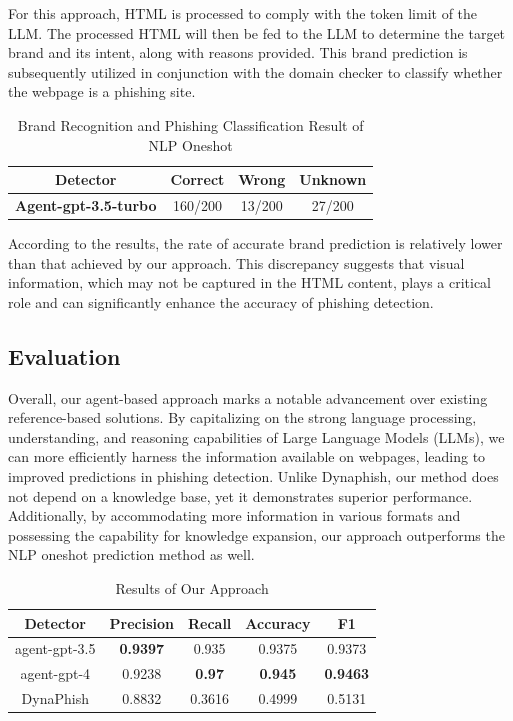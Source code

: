 For this approach, HTML is processed to comply with the token limit of the LLM. The processed HTML will then be fed to the LLM to determine the target brand and its intent, along with reasons provided. This brand prediction is subsequently utilized in conjunction with the domain checker to classify whether the webpage is a phishing site.

\begin{table}[h!]
    \centering
    \begin{tabular}{cccc}
     \textbf{Detector} & \textbf{Correct} & \textbf{Wrong} & \textbf{Unknown} \\
     \midrule
      \textbf{Agent-gpt-3.5-turbo}   & 160/200 & 13/200 & 27/200 \\
    \end{tabular}
    \caption{Brand Recognition and Phishing Classification Result of NLP Oneshot}
    \label{tab:my_label}
\end{table}

According to the results, the rate of accurate brand prediction is relatively lower than that achieved by our approach. This discrepancy suggests that visual information, which may not be captured in the HTML content, plays a critical role and can significantly enhance the accuracy of phishing detection.

\subsection{Evaluation}

Overall, our agent-based approach marks a notable advancement over existing reference-based solutions. By capitalizing on the strong language processing, understanding, and reasoning capabilities of Large Language Models (LLMs), we can more efficiently harness the information available on webpages, leading to improved predictions in phishing detection. Unlike Dynaphish, our method does not depend on a knowledge base, yet it demonstrates superior performance. Additionally, by accommodating more information in various formats and possessing the capability for knowledge expansion, our approach outperforms the NLP oneshot prediction method as well.

\begin{table}[h!]
  \centering
    \caption{Results of Our Approach}
  \begin{tabular}{ccccc}
    \textbf{Detector} & \textbf{Precision} & \textbf{Recall} & \textbf{Accuracy} & \textbf{F1} \\ %
    \midrule %
    agent-gpt-3.5 & \textbf{0.9397} &0.935 &0.9375 &0.9373 \\ %
    agent-gpt-4 & 0.9238 & \textbf{0.97} & \textbf{0.945} & \textbf{0.9463} \\ %
    DynaPhish & 0.8832 & 0.3616 & 0.4999 & 0.5131 \\

  \end{tabular}

  \label{tab:my_label}
\end{table}

